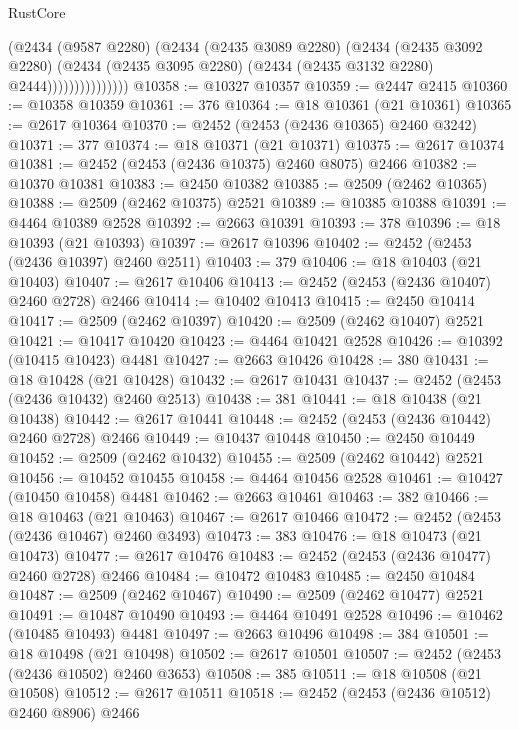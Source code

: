 \begin{lexlean}{RustCore}
\begin{coremodule}
                        (@2434
                          (@9587 @2280)
                          (@2434
                            (@2435 @3089 @2280)
                            (@2434
                              (@2435 @3092 @2280)
                              (@2434
                                (@2435 @3095 @2280)
                                (@2434 (@2435 @3132 @2280) @2444)))))))))))))))
@10358 := @10327 @10357
@10359 := @2447 @2415
@10360 := @10358 @10359
@10361 := 376
@10364 := @18 @10361 (@21 @10361)
@10365 := @2617 @10364
@10370 := @2452 (@2453 (@2436 @10365) @2460 @3242)
@10371 := 377
@10374 := @18 @10371 (@21 @10371)
@10375 := @2617 @10374
@10381 := @2452 (@2453 (@2436 @10375) @2460 @8075) @2466
@10382 := @10370 @10381
@10383 := @2450 @10382
@10385 := @2509 (@2462 @10365)
@10388 := @2509 (@2462 @10375) @2521
@10389 := @10385 @10388
@10391 := @4464 @10389 @2528
@10392 := @2663 @10391
@10393 := 378
@10396 := @18 @10393 (@21 @10393)
@10397 := @2617 @10396
@10402 := @2452 (@2453 (@2436 @10397) @2460 @2511)
@10403 := 379
@10406 := @18 @10403 (@21 @10403)
@10407 := @2617 @10406
@10413 := @2452 (@2453 (@2436 @10407) @2460 @2728) @2466
@10414 := @10402 @10413
@10415 := @2450 @10414
@10417 := @2509 (@2462 @10397)
@10420 := @2509 (@2462 @10407) @2521
@10421 := @10417 @10420
@10423 := @4464 @10421 @2528
@10426 := @10392 (@10415 @10423) @4481
@10427 := @2663 @10426
@10428 := 380
@10431 := @18 @10428 (@21 @10428)
@10432 := @2617 @10431
@10437 := @2452 (@2453 (@2436 @10432) @2460 @2513)
@10438 := 381
@10441 := @18 @10438 (@21 @10438)
@10442 := @2617 @10441
@10448 := @2452 (@2453 (@2436 @10442) @2460 @2728) @2466
@10449 := @10437 @10448
@10450 := @2450 @10449
@10452 := @2509 (@2462 @10432)
@10455 := @2509 (@2462 @10442) @2521
@10456 := @10452 @10455
@10458 := @4464 @10456 @2528
@10461 := @10427 (@10450 @10458) @4481
@10462 := @2663 @10461
@10463 := 382
@10466 := @18 @10463 (@21 @10463)
@10467 := @2617 @10466
@10472 := @2452 (@2453 (@2436 @10467) @2460 @3493)
@10473 := 383
@10476 := @18 @10473 (@21 @10473)
@10477 := @2617 @10476
@10483 := @2452 (@2453 (@2436 @10477) @2460 @2728) @2466
@10484 := @10472 @10483
@10485 := @2450 @10484
@10487 := @2509 (@2462 @10467)
@10490 := @2509 (@2462 @10477) @2521
@10491 := @10487 @10490
@10493 := @4464 @10491 @2528
@10496 := @10462 (@10485 @10493) @4481
@10497 := @2663 @10496
@10498 := 384
@10501 := @18 @10498 (@21 @10498)
@10502 := @2617 @10501
@10507 := @2452 (@2453 (@2436 @10502) @2460 @3653)
@10508 := 385
@10511 := @18 @10508 (@21 @10508)
@10512 := @2617 @10511
@10518 := @2452 (@2453 (@2436 @10512) @2460 @8906) @2466

\end{coremodule}
\end{lexlean}
